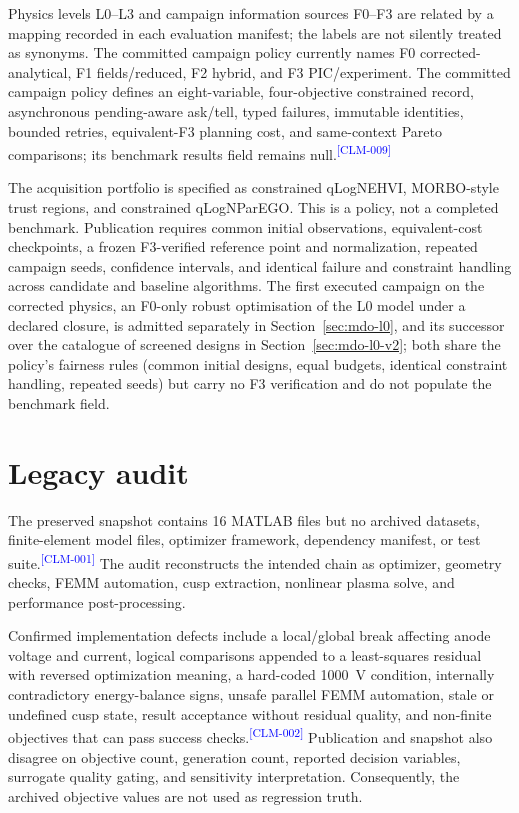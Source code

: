 \documentclass[11pt]{article}
\newcommand{\EvidenceClaim}[2]{#2\textsuperscript{\textcolor{blue}{[#1]}}}
\begin{document}
Physics levels L0--L3 and campaign information sources F0--F3 are related by a
mapping recorded in each evaluation manifest; the labels are not silently
treated as synonyms. The committed campaign policy currently names F0
corrected-analytical, F1 fields/reduced, F2 hybrid, and F3 PIC/experiment.
\EvidenceClaim{CLM-009}{The committed campaign policy defines an eight-variable,
four-objective constrained record, asynchronous pending-aware ask/tell, typed
failures, immutable identities, bounded retries, equivalent-F3 planning cost,
and same-context Pareto comparisons; its benchmark results field remains
null.}

The acquisition portfolio is specified as constrained qLogNEHVI, MORBO-style
trust regions, and constrained qLogNParEGO. This is a policy, not a completed
benchmark. Publication requires common initial observations, equivalent-cost
checkpoints, a frozen F3-verified reference point and normalization, repeated
campaign seeds, confidence intervals, and identical failure and constraint
handling across candidate and baseline algorithms. The first executed campaign
on the corrected physics, an F0-only robust optimisation of the L0 model under a
declared closure, is admitted separately in Section~\ref{sec:mdo-l0}, and its
successor over the catalogue of screened designs in Section~\ref{sec:mdo-l0-v2};
both share the policy's fairness rules (common initial designs, equal budgets,
identical constraint handling, repeated seeds) but carry no F3 verification and
do not populate the benchmark field.

\section{Legacy audit}

\EvidenceClaim{CLM-001}{The preserved snapshot contains 16 MATLAB files but no
archived datasets, finite-element model files, optimizer framework, dependency
manifest, or test suite.} The audit reconstructs the intended chain as optimizer,
geometry checks, FEMM automation, cusp extraction, nonlinear plasma solve, and
performance post-processing.

\EvidenceClaim{CLM-002}{Confirmed implementation defects include a local/global
break affecting anode voltage and current, logical comparisons appended to a
least-squares residual with reversed optimization meaning, a hard-coded 1000~V
condition, internally contradictory energy-balance signs, unsafe parallel FEMM
automation, stale or undefined cusp state, result acceptance without residual
quality, and non-finite objectives that can pass success checks.} Publication
and snapshot also disagree on objective count,
generation count, reported decision variables, surrogate quality gating, and
sensitivity interpretation. Consequently, the archived objective values are
not used as regression truth.
\end{document}
